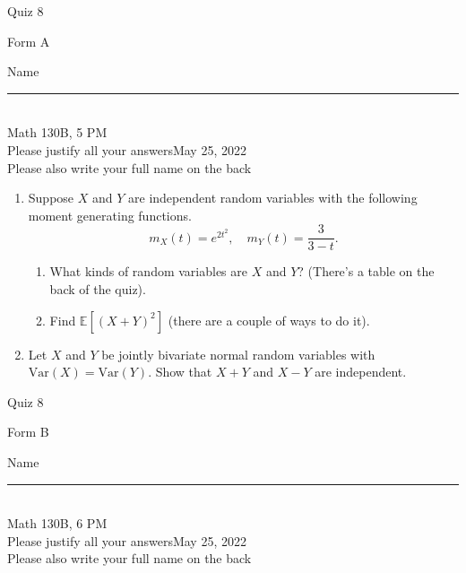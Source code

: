 \documentclass[12pt]{article}
\newcommand{\E}{\mathbb{E}}
\begin{document}
\begin{flushleft} 
\centerline{\LARGE{Quiz 8}} 
\vspace{5 mm}
{Form A}\hfill  
{Name \rule {2 in}{0.01in}}\\
Math 130B, 5 PM
\\
{Please justify all your answers}\hfill {May 25, 2022}
\\
{Please also write your full name on the back} 

\medskip
\end{flushleft}
\begin{enumerate}

	\item Suppose $X$ and $Y$ are independent random variables with the following moment generating functions.
	\[
		m_X(t) = e^{2t^2},\quad m_Y(t) = \frac{3}{3-t}.
	\]
	\begin{enumerate}
		\item What kinds of random variables are $X$ and $Y$? (There's a table on the back of the quiz).

		\vfill

		\item Find $\E[(X+Y)^2]$ (there are a couple of ways to do it).
	\end{enumerate}

	\vfill

	\item Let $X$ and $Y$ be jointly bivariate normal random variables with $\text{Var}(X) = \text{Var}(Y)$. Show that $X+Y$ and $X-Y$ are independent.

	\vfill\null
\end{enumerate}
\pagebreak


\begin{flushleft} 
\centerline{\LARGE{Quiz 8}} 
\vspace{5 mm}
{Form B}\hfill  
{Name \rule {2 in}{0.01in}}\\
Math 130B, 6 PM
\\
{Please justify all your answers}\hfill {May 25, 2022}
\\
{Please also write your full name on the back} 

\medskip
\end{flushleft}
\end{document}
